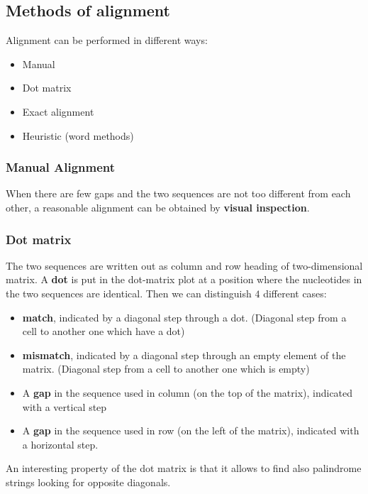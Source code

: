 \subsection{Methods of alignment}
Alignment can be performed in different ways:
\begin{itemize}
	\item Manual
	\item Dot matrix
	\item Exact alignment
	\item Heuristic (word methods)
\end{itemize}

\subsubsection{Manual Alignment}
When there are few gaps and the two sequences are not too different 
from each other, a reasonable alignment can be obtained by 
\textbf{visual inspection}. 

\subsubsection{Dot matrix}
The two sequences are written out as column and row heading of two-dimensional matrix. A \textbf{dot} is put in the dot-matrix plot at a position where the nucleotides in the two sequences are identical. Then we can distinguish $4$ different cases:
\begin{itemize}
	\item \textbf{match}, indicated by a diagonal step through a dot. (Diagonal step from a cell to another one which have a dot)
	
	\item \textbf{mismatch}, indicated by a diagonal step through an empty element of the matrix. (Diagonal step from a cell to another one which is empty)
	
	\item A \textbf{gap} in the sequence used in column (on the top of the matrix), indicated with a vertical step
	
	\item A \textbf{gap} in the sequence used in row (on the left of the matrix), indicated with a horizontal step.
\end{itemize}
An interesting property of the dot matrix is that it allows to find also palindrome strings looking for opposite diagonals.

